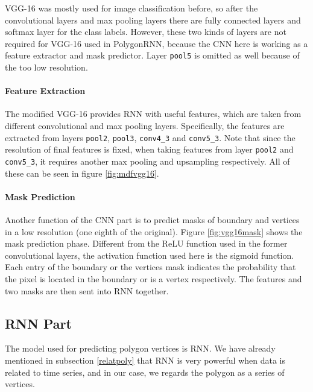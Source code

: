

VGG-16 was mostly used for image classification before, so after the convolutional layers and max pooling layers there are fully connected layers and softmax layer for the class labels. However, these two kinds of layers are not required for VGG-16 used in PolygonRNN, because the CNN here is working as a feature extractor and mask predictor. Layer \lstinline{pool5} is omitted as well because of the too low resolution.

\paragraph{Feature Extraction} The modified VGG-16 provides RNN with useful features, which are taken from different convolutional and max pooling layers. Specifically, the features are extracted from layers \lstinline{pool2}, \lstinline{pool3}, \lstinline{conv4_3} and \lstinline{conv5_3}. Note that since the resolution of final features is fixed, when taking features from layer \lstinline{pool2} and \lstinline{conv5_3}, it requires another max pooling and upsampling respectively. All of these can be seen in figure \ref{fig:mdfvgg16}.



\paragraph{Mask Prediction}
Another function of the CNN part is to predict masks of boundary and vertices in a low resolution (one eighth of the original). Figure \ref{fig:vgg16mask} shows the mask prediction phase. Different from the ReLU function used in the former convolutional layers, the activation function used here is the sigmoid function. Each entry of the boundary or the vertices mask indicates the probability that the pixel is located in the boundary or is a vertex respectively. The features and two masks are then sent into RNN together.


\subsection{RNN Part}\label{modrnn}
The model used for predicting polygon vertices is RNN. We have already mentioned in subsection \ref{relatpoly} that RNN is very powerful when data is related to time series, and in our case, we regards the polygon as a series of vertices.

